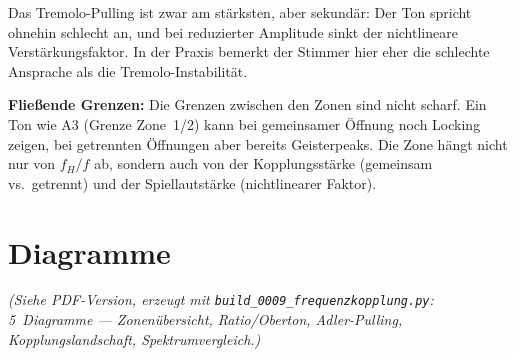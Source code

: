\documentclass[11pt,a4paper]{article}
\begin{document}
Das Tremolo-Pulling ist zwar am stärksten, aber sekundär: Der Ton spricht ohnehin schlecht an, und bei reduzierter Amplitude sinkt der nichtlineare Verstärkungsfaktor. In der Praxis bemerkt der Stimmer hier eher die schlechte Ansprache als die Tremolo-Instabilität.

\begin{table}[H]
\centering\small
\caption{Übersicht der drei Zonen}
\end{table}

\begin{warnbox}
\textbf{Fließende Grenzen:} Die Grenzen zwischen den Zonen sind nicht scharf. Ein Ton wie A3 (Grenze Zone~1/2) kann bei gemeinsamer Öffnung noch Locking zeigen, bei getrennten Öffnungen aber bereits Geisterpeaks. Die Zone hängt nicht nur von $f_H/f$ ab, sondern auch von der Kopplungsstärke (gemeinsam vs.\ getrennt) und der Spiellautstärke (nichtlinearer Faktor).
\end{warnbox}

\section{Diagramme}

\begin{flushleft}
\small\itshape(Siehe PDF-Version, erzeugt mit \texttt{build\_0009\_frequenzkopplung.py}:
5~Diagramme --- Zonenübersicht, Ratio/Oberton, Adler-Pulling, Kopplungslandschaft, Spektrumvergleich.)
\end{flushleft}
\end{document}
